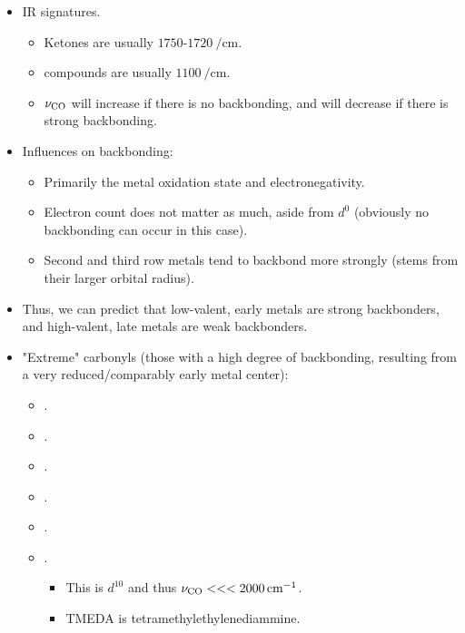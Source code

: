 \documentclass[../notes.tex]{subfiles}
\begin{document}
\begin{itemize}
    \item IR signatures.
    \begin{itemize}
        \item Ketones are usually $\num{1750}$-$\SI{1720}{\per\centi\meter}$.
        \item {} compounds are usually $\SI{1100}{\per\centi\meter}$.
        \item $\nu_{\ce{CO}}$ will increase if there is no backbonding, and will decrease if there is strong backbonding.
    \end{itemize}
    \item Influences on backbonding:
    \begin{itemize}
        \item Primarily the metal oxidation state and electronegativity.
        \item Electron count does not matter as much, aside from $d^0$ (obviously no backbonding can occur in this case).
        \item Second and third row metals tend to backbond more strongly (stems from their larger orbital radius).
    \end{itemize}
    \item Thus, we can predict that low-valent, early metals are strong backbonders, and high-valent, late metals are weak backbonders.
    \item "Extreme" carbonyls (those with a high degree of backbonding, resulting from a very reduced/comparably early metal center):
    \begin{itemize}
        \item {}.
        \item {}.
        \item {}.
        \item {}.
        \item {}.
        \item {}.
        \begin{itemize}
            \item This is $d^{10}$ and thus $\nu_{\ce{CO}}<<<\SI{2000}{\per\centi\meter}$.
            \item TMEDA is tetramethylethylenediammine.
        \end{itemize}
    \end{itemize}

\end{itemize}
\end{document}

